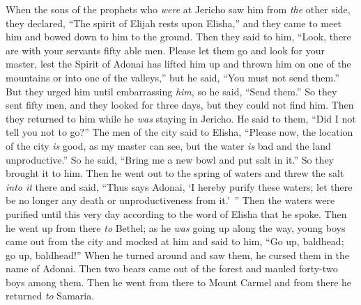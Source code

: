 \begin{biblechapter}
 When the sons of the prophets who \textit{were} at Jericho saw him from \textit{the} other side, they declared, “The spirit of Elijah rests upon Elisha,” and they came to meet him and bowed down to him to the ground.
\verse Then they said to him, “Look, there are with your servants fifty able men. Please let them go and look for your master, lest the Spirit of Adonai has lifted him up and thrown him on one of the mountains or into one of the valleys,” but he said, “You must not send them.”
\verse But they urged him until embarrassing \textit{him}, so he said, “Send them.” So they sent fifty men, and they looked for three days, but they could not find him.
\verse Then they returned to him while he \textit{was} staying in Jericho. He said to them, “Did I not tell you not to go?”
\verse The men of the city said to Elisha, “Please now, the location of the city \textit{is} good, as my master can see, but the water \textit{is} bad and the land unproductive.”
\verse So he said, “Bring me a new bowl and put salt in it.” So they brought it to him.
\verse Then he went out to the spring of waters and threw the salt \textit{into it} there and said, “Thus says Adonai, ‘I hereby purify these waters; let there be no longer any death or unproductiveness from it.’ ”
\verse Then the waters were purified until this very day according to the word of Elisha that he spoke.
\verse Then he went up from there \textit{to} Bethel; as he \textit{was} going up along the way, young boys came out from the city and mocked at him and said to him, “Go up, baldhead; go up, baldhead!”
\verse When he turned around and saw them, he cursed them in the name of Adonai. Then two bears came out of the forest and mauled forty-two boys among them.
\verse Then he went from there to Mount Carmel and from there he returned \textit{to} Samaria.
\end{biblechapter}

